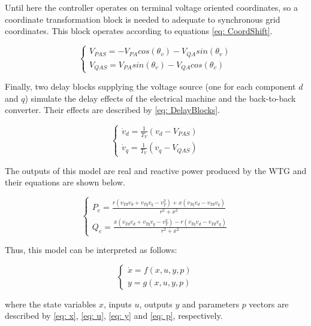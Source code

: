 Until here the controller operates on terminal voltage oriented coordinates, so a coordinate transformation block is needed to adequate to synchronous grid coordinates. This block operates according to equations \eqref{eq: CoordShift}.

\begin{equation}
	\begin{cases}
		V_{PAS} = -V_{PA}cos(\theta_{v}) - V_{QA}sin(\theta_{v}) \\
		V_{QAS} = V_{PA}sin(\theta_{v}) - V_{QA}cos(\theta_{v})
	\end{cases}
	\label{eq: CoordShift}
\end{equation}

Finally, two delay blocks supplying the voltage source (one for each component $d$ and $q$) simulate the delay effects of the electrical machine and the back-to-back converter. Their effects are described by \eqref{eq: DelayBlocks}.

\begin{equation}
	\begin{cases}
		\dot{v}_{d} = \frac{1}{T_{V}}(v_{d} - V_{PAS}) \\
		\dot{v}_{q} = \frac{1}{T_{V}}(v_{q} - V_{QAS})
	\end{cases}
	\label{eq: DelayBlocks}
\end{equation}

The outputs of this model are real and reactive power produced by the WTG and their equations are shown below.

\begin{equation}
	\begin{cases}
		P_{e} = \frac{r(v_{Td}v_{d} + v_{Tq}v_{q} - v_{T}^{2}) + x(v_{Tq}v_{d} - v_{Td}v_{q})}{r^{2} + x^{2}} \\
		Q_{e} = \frac{x(v_{Td}v_{d} + v_{Tq}v_{q} - v_{T}^{2}) - r(v_{Tq}v_{d} - v_{Td}v_{q})}{r^{2} + x^{2}}
	\end{cases}
	\label{eq: Outputs}
\end{equation}

Thus, this model can be interpreted as follows:

\begin{equation}
	\begin{cases}
		\dot{x} = f(x, u, y, p) \\
		y = g(x, u, y, p)
	\end{cases}
	\label{eq: xdot}
\end{equation}

\noindent where the state variables $x$, inputs $u$, outputs $y$ and parameters $p$ vectors are described by \eqref{eq: x}, \eqref{eq: u}, \eqref{eq: y} and \eqref{eq: p}, respectively.

